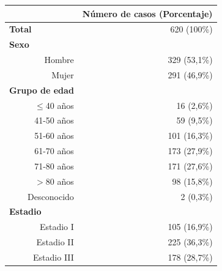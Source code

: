 \begin{table}[H]
		\centering
	\begin{tabular}{rr}
		\cline{2-2}
		\multicolumn{1}{l}{}                       & \multicolumn{1}{c}{\textbf{Número de casos (Porcentaje)}} \\ \hline
		\multicolumn{1}{l}{\textbf{Total}}         & 620 (100\%)                                               \\ \hline
		\multicolumn{1}{l}{\textbf{Sexo}}          &                                                           \\
		Hombre                                     & 329 (53,1\%)                                              \\
		Mujer                                      & 291 (46,9\%)                                              \\ \hline
		\multicolumn{1}{l}{\textbf{Grupo de edad}} &                                                           \\
		$\leq$40 años                                   & 16 (2,6\%)                                                \\
		41-50 años                                 & 59 (9,5\%)                                                \\
		51-60 años                                 & 101 (16,3\%)                                              \\
		61-70 años                                 & 173 (27,9\%)                                              \\
		71-80 años                                 & 171 (27,6\%)                                              \\
		$>$80 años                               & 98 (15,8\%)                                               \\
		Desconocido                                & 2 (0,3\%)                                                 \\ \hline
		\multicolumn{1}{l}{\textbf{Estadio}}       &                                                           \\
		Estadio I                                  & 105 (16,9\%)                                              \\
		Estadio II                                 & 225 (36,3\%)                                              \\
		Estadio III                                & 178 (28,7\%)                                              \\

\end{tabular}
\end{table}
